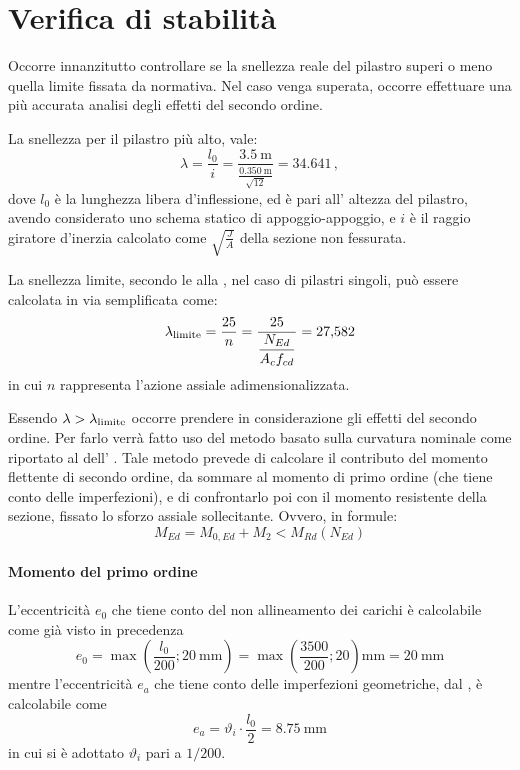 \section{Verifica di stabilità}
Occorre innanzitutto controllare se la snellezza reale del pilastro superi o meno quella limite fissata da normativa. 
Nel caso venga superata, occorre effettuare una più accurata analisi degli effetti del secondo ordine.

La snellezza per il pilastro più alto, vale:
\begin{equation}
    \lambda = \frac{l_0}{i} = \frac{\SI{3.5}{\metre}}{\frac{\SI{0.350}{\metre}}{\sqrt{12}}} = \num{34.641} \, ,
\end{equation}
dove $l_0$ è la lunghezza libera d'inflessione, ed è pari all' altezza del pilastro, avendo considerato uno schema statico di appoggio-appoggio, 
e $i$ è il raggio giratore d'inerzia calcolato come $\sqrt{\frac{J}{A}}$ della sezione non fessurata.

La snellezza limite, secondo le  alla \normaref{[4.1.41]}, nel caso di pilastri singoli, può essere calcolata in via semplificata come:
\begin{equation}
    \lambda_\textup{limite} = \frac{25}{n} =  \frac{25}{\dfrac{N_{Ed}}{A_c f_{cd}}} = \num{27.582}
\end{equation}
in cui $n$ rappresenta l'azione assiale adimensionalizzata.

Essendo $\lambda > \lambda_\textup{limite}$ occorre prendere in considerazione gli effetti del secondo ordine.
Per farlo verrà fatto uso del metodo basato sulla curvatura nominale come riportato al  dell' .
Tale metodo prevede di calcolare il contributo del momento flettente di secondo ordine, da sommare al momento di primo ordine (che tiene conto delle imperfezioni), e di confrontarlo poi con il momento resistente della sezione, fissato lo sforzo assiale sollecitante. 
Ovvero, in formule:
\begin{equation}
    M_{Ed} = M_{0,Ed} + M_2 < M_{Rd}(N_{Ed})
\end{equation}

\paragraph{Momento del primo ordine}
L'eccentricità $e_0$ che tiene conto del non allineamento dei carichi è calcolabile come già visto in precedenza
\[
    e_0 = \max \left(\frac{l_0}{200};  \SI{20}{\milli\metre} \right)  = \max \left(\frac{3500}{200};  20 \right)\si{\milli\metre} = \SI{20}{\milli\metre}
\]
mentre l'eccentricità $e_a$ che tiene conto delle imperfezioni geometriche, dal , è calcolabile come
\[
    e_a = \vartheta_i \cdot \frac{l_0}{2} = \SI{8.75}{\milli\metre}
\]
in cui si è adottato $\vartheta_i$ pari a $1/200$.

